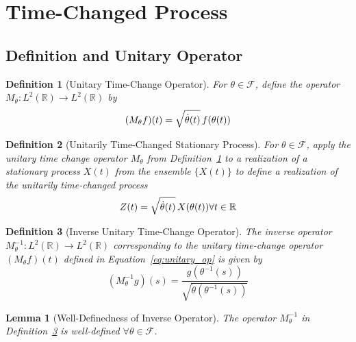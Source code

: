 \documentclass{article}
\newtheorem{definition}{Definition}
\newtheorem{lemma}{Lemma}
{\theorembodyfont{\rmfamily}\newtheorem{remark}{Remark}}
\begin{document}
\section{Time-Changed Process}\label{sec:time_change}

\subsection{Definition and Unitary Operator}

\begin{definition}
[Unitary Time-Change Operator]\label{def:unitary_op}For $\theta \in
\mathcal{F}$, define the operator $M_{\theta} : L^2 (\mathbb{R}) \to L^2
(\mathbb{R})$ by
\begin{equation}
\label{eq:unitary_op} (M_{\theta} f) (t) = \sqrt{\dot{\theta} (t)}
\hspace{0.17em} f (\theta (t))
\end{equation}
\end{definition}

\begin{definition}
[Unitarily Time-Changed Stationary Process]\label{def:time_changed_proc} For
$\theta \in \mathcal{F}$, apply the unitary time change operator
$M_{\theta}$ from Definition~\ref{def:unitary_op} to a realization of a
stationary process $X (t)$ from the ensemble $\{ X (t) \}$ to define a
realization of the unitarily time-changed process
\begin{equation}
\label{eq:time_change} Z (t) = \sqrt{\dot{\theta} (t)} \hspace{0.17em} X
(\theta (t)) \forall t \in \mathbb{R}
\end{equation}
\end{definition}

\begin{definition}
[Inverse Unitary Time-Change Operator]\label{def:inverse_unitary_op} The
inverse operator $M_{\theta}^{- 1} : L^2 (\mathbb{R}) \to L^2 (\mathbb{R})$
corresponding to the unitary time-change operator $(M_{\theta} f) (t)$
defined in Equation~\ref{eq:unitary_op} is given by
\begin{equation}
\label{eq:unitary_inverse} (M_{\theta}^{- 1} g) (s) = \frac{g (\theta^{-
1} (s))}{\sqrt{\dot{\theta} (\theta^{- 1} (s))}}
\end{equation}
\end{definition}

\begin{lemma}
[Well-Definedness of Inverse Operator]\label{lem:inverse_well_defined} The
operator $M_{\theta}^{- 1}$ in Definition~\ref{def:inverse_unitary_op} is
well-defined $\forall \theta \in \mathcal{F}$.
\end{lemma}
\end{document}
